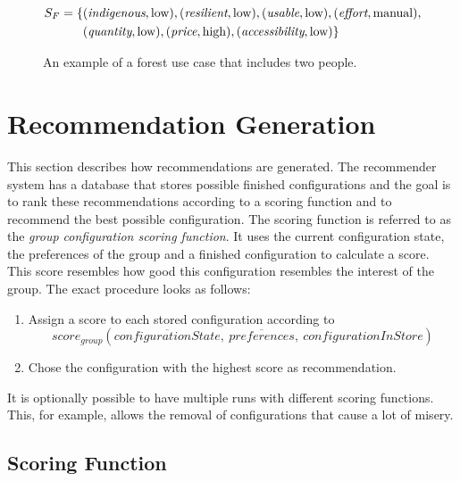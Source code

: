\begin{figure}
\begin{mdframed}[frametitle={Example for Forest Use Case}, linecolor=black, frametitlerulecolor=black, frametitlebackgroundcolor=gray!5]
\begin{align}
            \begin{split}
            S_F  =  \{ & (\textit{indigenous}, \text{low}), (\textit{resilient}, \text{low}), (\textit{usable},\text{low}), (\textit{effort}, \text{manual}), \\
            & (\textit{quantity}, \text{low}), (\textit{price},\text{high}),(\textit{accessibility}, \text{low}) \} 
            \end{split} \notag
        \end{align}
    \end{mdframed}
    \caption{An example of a forest use case that includes two people.}
    \label{fig:Concept:ForestExample}
\end{figure}


\section{Recommendation Generation}
\label{sec:Concept:SolutionGeneration}

This section describes how recommendations are generated. The recommender system has a database that stores possible finished configurations and the goal is to rank these recommendations according to a scoring function and to recommend the best possible configuration. The scoring function is referred to as the \emph{group configuration scoring function}. It uses the current configuration state, the preferences of the group and a finished configuration to calculate a score. This score resembles how good this configuration resembles the interest of the group. The exact procedure looks as follows:

\begin{enumerate}
    \item Assign a score to each stored configuration according to $$score_{group}(\overline{configurationState},\ \overline{preferences}, \ configurationInStore)$$
    \item Chose the configuration with the highest score as recommendation.
\end{enumerate}

It is optionally possible to have multiple runs with different scoring functions. This, for example, allows the removal of configurations that cause a lot of misery.



\subsection{Scoring Function}

